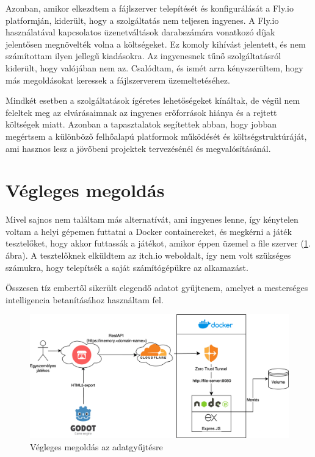 Azonban, amikor elkezdtem a fájlszerver telepítését és konfigurálását a Fly.io platformján, kiderült, hogy a szolgáltatás nem teljesen ingyenes.
A Fly.io használatával kapcsolatos üzenetváltások darabszámára vonatkozó díjak jelentősen 
megnövelték volna a költségeket. Ez komoly kihívást jelentett, és nem számítottam ilyen jellegű kiadásokra. 
Az ingyenesnek tűnő szolgáltatásról kiderült, 
hogy valójában nem az. Csalódtam, és ismét arra kényszerültem, hogy más megoldásokat keressek a fájlszerverem üzemeltetéséhez.

Mindkét esetben a szolgáltatások ígéretes lehetőségeket kínáltak, de végül nem feleltek meg az elvárásaimnak az ingyenes erőforrások hiánya és a rejtett költségek miatt. Azonban a tapasztalatok segítettek abban, hogy jobban megértsem a különböző felhőalapú platformok működését és költségstruktúráját, ami hasznos lesz a jövőbeni projektek tervezésénél és megvalósításánál.
\section{Végleges megoldás}
Mivel sajnos nem találtam más alternatívát, ami ingyenes lenne, így kénytelen voltam a helyi gépemen futtatni a Docker containereket, és megkérni a játék tesztelőket, hogy akkor futtassák a játékot, amikor éppen üzemel a file szerver (\ref{img:adatgyujtes}. ábra).
A tesztelőknek elküldtem az itch.io weboldalt, így nem volt szükséges számukra, hogy telepítsék a saját számítógépükre az alkamazást.

Összesen tíz embertől sikerült elegendő adatot gyűjtenem, amelyet a mesterséges intelligencia betanításához használtam fel.

\begin{figure}[h]
  \centering
  \includegraphics[width=\textwidth]{img/adatgyujtes.png}
  \caption{Végleges megoldás az adatgyűjtésre}
  \label{img:adatgyujtes}  
\end{figure}

